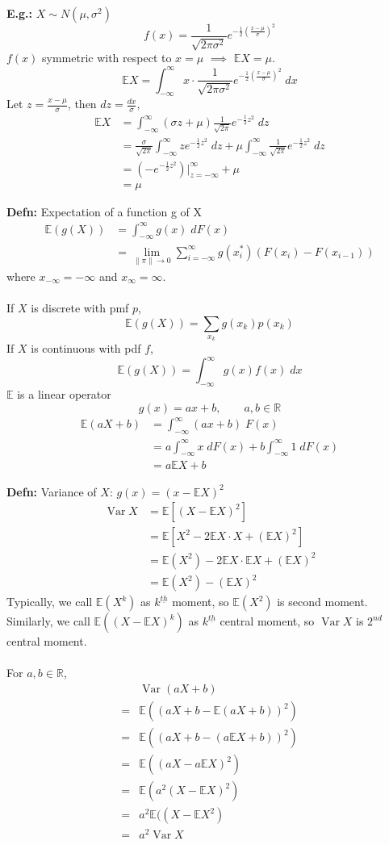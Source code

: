 \documentclass[a4paper]{article}
\newcommand{\n}{\hfill\break}
\newcommand{\defn}[1]{\par\noindent\settowidth{\hangindent}{\textbf{Defn: }}\textbf{Defn: }#1\n}
\newcommand{\eg}[1]{\par\noindent\settowidth{\hangindent}{\textbf{E.g.: }}\textbf{E.g.: }#1\n}
\newcommand{\reals}{\mathbb{R}}
\newcommand{\R}{\reals}
\newcommand{\Avg}{\mathbb{E}}
\newcommand{\E}{\Avg}
\DeclareMathOperator{\Var}{Var}
\begin{document}
\eg{$X\sim N(\mu, \sigma^2)$
\[f(x)=\frac{1}{\sqrt{2\pi\sigma^2}}e^{-\frac{1}{2}\left(\frac{x-\mu}{\sigma}\right)^2}\]
$f(x)$ symmetric with respect to $x=\mu$ $\implies$ $\E X=\mu$.
\[\E X=\int^\infty_{-\infty} x\cdot\frac{1}{\sqrt{2\pi\sigma^2}}e^{-\frac{1}{2}\left(\frac{x-\mu}{\sigma}\right)^2}\;dx\]
Let $z=\frac{x-\mu}{\sigma}$, then $dz=\frac{dx}{\sigma}$,
\begin{align*}
    \E X&=\int^\infty_{-\infty}(\sigma z+\mu)\frac{1}{\sqrt{2\pi}}e^{-\frac{1}{2}z^2}\;dz \\
    &=\frac{\sigma}{\sqrt{2\pi}}\int^\infty_{-\infty}ze^{-\frac{1}{2}z^2}\;dz+\mu\int^\infty_{-\infty}\frac{1}{\sqrt{2\pi}} e^{-\frac{1}{2}z^2}\;dz \\
    &=\left(-e^{-\frac{1}{2}z^2}\right)\bigg\vert^\infty_{z=-\infty}+\mu \\
    &=\mu
\end{align*}
}

\defn{Expectation of a function g of X
\begin{align*}
    \E(g(X))&=\int^\infty_{-\infty} g(x)\;dF(x) \\
    &=\lim_{\|\pi\|\rightarrow0}\sum^\infty_{i=-\infty}g(x_i^*)(F(x_i)-F(x_{i-1}))
\end{align*}
where $x_{-\infty}=-\infty$ and $x_\infty=\infty$.
\\\\
If $X$ is discrete with pmf $p$,
\[\E(g(X))=\sum_{x_k}g(x_k)p(x_k)\]
If $X$ is continuous with pdf $f$,
\[\E(g(X))=\int^\infty_{-\infty} g(x)f(x)\;dx\]
$\E$ is a linear operator
\[g(x)=ax+b,\qquad a, b\in\R\]
\begin{align*}
    \E(aX+b)&=\int_{-\infty}^\infty(ax+b)\;F(x) \\
    &=a\int_{-\infty}^\infty x\;dF(x)+b\int_{-\infty}^\infty1\;dF(x) \\
    &=a\E X+b
\end{align*}
}

\defn{Variance of $X$: $g(x)=(x-\E X)^2$
\begin{align*}
    \Var X&=\E[(X-\E X)^2] \\
    &=\E[X^2-2\E X\cdot X+(\E X)^2] \\
    &=\E(X^2)-2\E X\cdot\E X+(\E X)^2 \\
    &=\E(X^2)-(\E X)^2
\end{align*}
Typically, we call $\E(X^k)$ as $k^{\underline{th}}$ moment, so $\E(X^2)$ is second moment. \\
Similarly, we call $\E((X-\E X)^k)$ as $k^{\underline{th}}$ central moment, so $\Var X$ is $2^{nd}$ central moment. 
\\\\
For $a, b\in\R$, 
\begin{align*}
    &\Var(aX+b) \\
    =&\E((aX+b-\E(aX+b))^2) \\
    =&\E((aX+b-(a\E X+b))^2) \\
    =&\E((aX-a\E X)^2) \\
    =&\E(a^2(X-\E X)^2) \\
    =&a^2\E((X-\E X^2) \\
    =&a^2\Var X
\end{align*}
}
\end{document}
